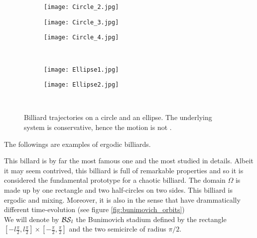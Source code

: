 \begin{figure}[H]
\centering
  \begin{subfigure}[b]{0.3\textwidth}
  \centering
    \texttt{[image: Circle\_2.jpg]}
    \label{fig:circ1}
  \end{subfigure}
  \begin{subfigure}[b]{0.3\textwidth}
  \centering
    \texttt{[image: Circle\_3.jpg]}
    \label{fig:circ2}
  \end{subfigure}
  \begin{subfigure}[b]{0.3\textwidth}
  \centering
    \texttt{[image: Circle\_4.jpg]}
    \label{fig:circ3}
  \end{subfigure}
  \noindent\\
  \begin{subfigure}[b]{0.4\textwidth}
  \centering
    \texttt{[image: Ellipse1.jpg]}
    \label{fig:ellip1}
  \end{subfigure}
  \begin{subfigure}[b]{0.4\textwidth}
  \centering
    \texttt{[image: Ellipse2.jpg]}
    \label{fig:ellip2}
  \end{subfigure}
  \noindent\\
  \decoRule
  \caption{Billiard trajectories on a circle and an ellipse. The underlying system is conservative, hence the motion is not .}
  \label{fig:ell_circ_billiards}
\end{figure}


The followings are examples of ergodic billiards.

\begin{nese}
\label{ese:bunimovich_stadium}
This billard is by far the most famous one and the most studied in details. Albeit it may seem contrived, this billiard is full of remarkable properties and so it is considered the fundamental prototype for a chaotic billiard. The domain $\Omega$ is made up by one rectangle and two half-circles on two sides. This billiard is ergodic and mixing. Moreover, it is also  in the sense that  have drammatically different time-evolution (see figure \ref{fig:bunimovich_orbits})\\
We will denote by $\operatorname{\mathcal{BS}}_{l}$ the Bunimovich stadium defined by the rectangle $\left[
-l\frac{\pi}{2},l\frac{\pi}{2}
\right]\times
\left[
-\frac{\pi}{2},\frac{\pi}{2}
\right]$ and the two semicircle of radius $\pi/2$.
\end{nese}


